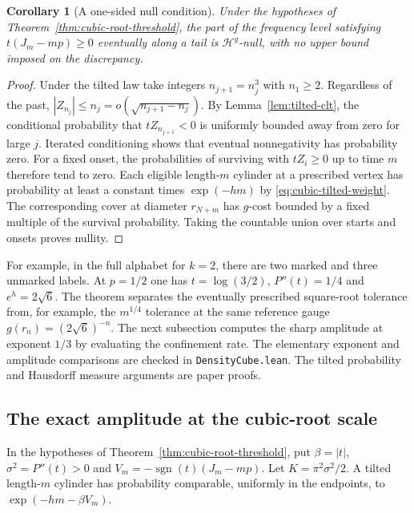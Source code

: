 \documentclass[11pt]{article}
\newtheorem{corollary}[theorem]{Corollary}
\theoremstyle{definition}
\theoremstyle{remark}
\begin{document}
\begin{corollary}[A one-sided null condition]
\label{cor:off-perron-one-sided}
Under the hypotheses of Theorem~\ref{thm:cubic-root-threshold},
the part of the frequency level satisfying $t(J_m-mp)\ge0$
eventually along a tail is $\mathcal H^g$-null, with no upper
bound imposed on the discrepancy.
\end{corollary}
\begin{proof}
Under the tilted law take integers $n_{j+1}=n_j^3$ with
$n_1\ge2$. Regardless of the past,
$|Z_{n_j}|\le n_j=o(\sqrt{n_{j+1}-n_j})$.
By Lemma~\ref{lem:tilted-clt}, the conditional probability
that $tZ_{n_{j+1}}<0$ is uniformly bounded away from zero
for large $j$. Iterated conditioning shows that eventual
nonnegativity has probability zero. For a fixed onset,
the probabilities of surviving with $tZ_i\ge0$ up to time
$m$ therefore tend to zero. Each eligible length-$m$
cylinder at a prescribed vertex has probability at least
a constant times $\exp(-hm)$ by \eqref{eq:cubic-tilted-weight}.
The corresponding cover at diameter $r_{N+m}$ has
$g$-cost bounded by a fixed multiple of the survival probability.
Taking the countable union over starts and onsets proves nullity.
\end{proof}


For example, in the full alphabet for $k=2$, there are two
marked and three unmarked labels. At $p=1/2$ one has
$t=\log(3/2)$, $P''(t)=1/4$ and $e^h=2\sqrt6$.
The theorem separates the eventually prescribed square-root
tolerance from, for example, the $m^{1/4}$ tolerance at
the same reference gauge $g(r_n)=(2\sqrt6)^{-n}$.
The next subsection computes the sharp amplitude at exponent
$1/3$ by evaluating the confinement rate. The elementary exponent and amplitude
comparisons are checked in \texttt{DensityCube.lean}.
The tilted probability and Hausdorff measure arguments are paper proofs.



\subsection{The exact amplitude at the cubic-root scale}

In the hypotheses of Theorem~\ref{thm:cubic-root-threshold}, put
$\beta=|t|$, $\sigma^2=P''(t)>0$ and
$V_m=-\operatorname{sgn}(t)(J_m-mp)$.
Let $K=\pi^2\sigma^2/2$. A tilted length-$m$ cylinder has probability
comparable, uniformly in the endpoints, to $\exp(-hm-\beta V_m)$.
\end{document}

